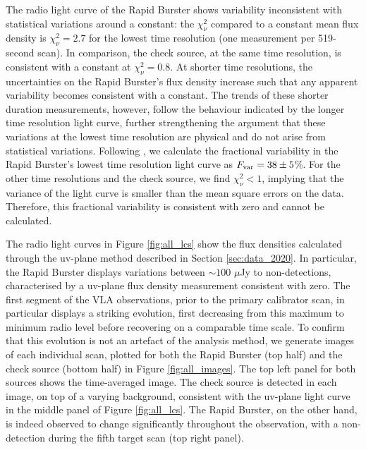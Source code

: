 \documentclass[fleqn,usenatbib]{mnras}
\begin{document}
The radio light curve of the Rapid Burster shows variability inconsistent with statistical variations around a constant: the $\chi^2_\nu$ compared to a constant mean flux density is $\chi^2_\nu = 2.7$ for the lowest time resolution (one measurement per 519-second scan). In comparison, the check source, at the same time resolution, is consistent with a constant at $\chi^2_\nu = 0.8$. At shorter time resolutions, the uncertainties on the Rapid Burster's flux density increase such that any apparent variability becomes consistent with a constant. The trends of these shorter duration measurements, however, follow the behaviour indicated by the longer time resolution light curve, further strengthening the argument that these variations at the lowest time resolution are physical and do not arise from statistical variations. Following \citet{vaughan2003}, we calculate the fractional variability in the Rapid Burster's lowest time resolution light curve as $F_{\rm var} = 38 \pm 5$\%. For the other time resolutions and the check source, we find $\chi^2_\nu < 1$, implying that the variance of the light curve is smaller than the mean square errors on the data. Therefore, this fractional variability is consistent with zero and cannot be calculated. 

The radio light curves in Figure \ref{fig:all_lcs} show the flux densities calculated through the uv-plane method described in Section \ref{sec:data_2020}. In particular, the Rapid Burster displays variations between $\sim 100$ $\mu$Jy to non-detections, characterised by a uv-plane flux density measurement consistent with zero. The first segment of the VLA observations, prior to the primary calibrator scan, in particular displays a striking evolution, first decreasing from this maximum to minimum radio level before recovering on a comparable time scale. To confirm that this evolution is not an artefact of the analysis method, we generate images of each individual scan, plotted for both the Rapid Burster (top half) and the check source (bottom half) in Figure \ref{fig:all_images}. The top left panel for both sources shows the time-averaged image. The check source is detected in each image, on top of a varying background, consistent with the uv-plane light curve in the middle panel of Figure \ref{fig:all_lcs}. The Rapid Burster, on the other hand, is indeed observed to change significantly throughout the observation, with a non-detection during the fifth target scan (top right panel). 
\end{document}
